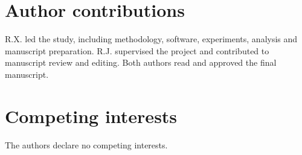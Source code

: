 \documentclass[aps,physrev,\manuscriptlayout,superscriptaddress,
  longbibliography,amsmath,amssymb]{revtex4-2}
\begin{document}
\section*{Author contributions}

R.X. led the study, including methodology, software, experiments, analysis and manuscript preparation. R.J. supervised the project and contributed to manuscript review and editing. Both authors read and approved the final manuscript.


\section*{Competing interests}

The authors declare no competing interests.


\end{document}
